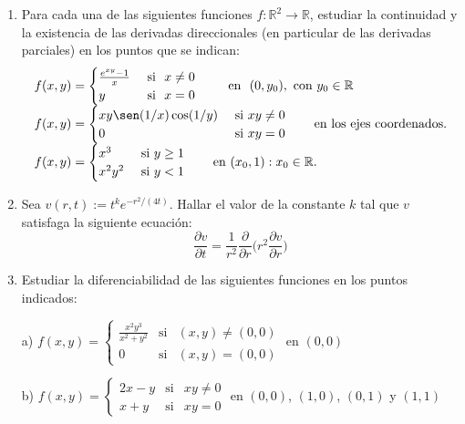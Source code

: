 \documentclass[11pt]{article}
\newcommand{\R}{\mathbb{R}}
\begin{document}
\begin{enumerate}
\begin{enumerate}
\end{enumerate}
  
   
\item Para cada una de las siguientes funciones $f:\R^2\to \R$,
  estudiar la continuidad y la existencia de las derivadas
  direccionales (en particular de las derivadas parciales) en los
  puntos que se indican: 
\[\begin{array}{l}
   f(x,y)=\begin{cases}
              \frac{e^{xy}-1}{x} & \textrm{ si }\ x\neq 0\\ 
              y &\textrm{ si }\ x=0 
          \end{cases} 
              \qquad \textrm{ en }\ (0,y_0), \textrm{ con }y_0 \in
              \R\\  
   f(x,y)=\begin{cases}
              xy\sen(1/x)\cos(1/y) &\textrm{ si }xy\neq 0 \\ 
              0 &\textrm{ si }xy=0
          \end{cases} \textrm{\qquad en los ejes coordenados.}\\
   f(x,y)=\begin{cases}
              x^3    &\textrm{ si } y\geq 1 \\ 
              x^2y^2 &\textrm{ si } y <1 
          \end{cases} \textrm{\qquad en } (x_0,1):x_0\in \R.
   \end{array}\]  
   
\item Sea $v(r,t):=t^ke^{-r^2/(4t)}$. Hallar el valor de la constante $k$ tal que $v$ satisfaga la siguiente ecuaci\'on: 
      \[\frac{\partial v}{\partial
        t}=\frac{1}{r^2}\frac{\partial}{\partial
        r}\Big(r^2\frac{\partial v}{\partial r}\Big)\]    
        
\item Estudiar la diferenciabilidad de las siguientes funciones en los puntos
indicados:

a) $f(x,y)=\left\{ 
\begin{array}{ccc}
\frac{x^{2}y^{3}}{x^{2}+y^{2}} & \text{si} & \left( x,y\right) \neq \left(
0,0\right)  \\ 
0 & \text{si} & \left( x,y\right) =\left( 0,0\right) 
\end{array}%
\right. $ en $\left( 0,0\right) $ 

b) $f(x,y)=\left\{ 
\begin{array}{ccc}
2x-y & \text{si} & xy\neq 0 \\ 
x+y & \text{si} & xy=0%
\end{array}%
\right. $ en $\left( 0,0\right) $, $\left( 1,0\right) $, $\left( 0,1\right) $
y $\left( 1,1\right) $ 


\end{enumerate}
\end{document}
